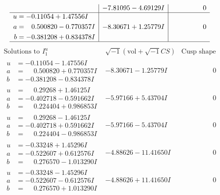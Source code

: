 \documentclass[1p]{elsarticle_modified}
\theoremstyle{definition}
\newcommand{\I}{\sqrt{-1}}
\begin{document}
$$\begin{array}{c|c|c}
 & -7.81095 - 4.69129 I & \phantom{-0.000000 } 0 \\ \hline\begin{aligned}
u &= -0.11054 + 1.47556 I \\
a &= \phantom{-}0.500820 - 0.770357 I \\
b &= -0.381208 + 0.834378 I\end{aligned}
 & -8.30671 + 1.25779 I & \phantom{-0.000000 } 0\\
 \hline 
 \end{array}$$\newpage$$\begin{array}{c|c|c}  
\text{Solutions to }I^u_{1}& \I (\text{vol} + \sqrt{-1}CS) & \text{Cusp shape}\\
 \hline 
\begin{aligned}
u &= -0.11054 - 1.47556 I \\
a &= \phantom{-}0.500820 + 0.770357 I \\
b &= -0.381208 - 0.834378 I\end{aligned}
 & -8.30671 - 1.25779 I & \phantom{-0.000000 } 0 \\ \hline\begin{aligned}
u &= \phantom{-}0.29268 + 1.46125 I \\
a &= -0.402718 - 0.591662 I \\
b &= \phantom{-}0.224404 + 0.986853 I\end{aligned}
 & -5.97166 + 5.43704 I & \phantom{-0.000000 } 0 \\ \hline\begin{aligned}
u &= \phantom{-}0.29268 - 1.46125 I \\
a &= -0.402718 + 0.591662 I \\
b &= \phantom{-}0.224404 - 0.986853 I\end{aligned}
 & -5.97166 - 5.43704 I & \phantom{-0.000000 } 0 \\ \hline\begin{aligned}
u &= -0.33248 + 1.45296 I \\
a &= -0.522607 + 0.612576 I \\
b &= \phantom{-}0.276570 - 1.013290 I\end{aligned}
 & -4.88626 - 11.41650 I & \phantom{-0.000000 } 0 \\ \hline\begin{aligned}
u &= -0.33248 - 1.45296 I \\
a &= -0.522607 - 0.612576 I \\
b &= \phantom{-}0.276570 + 1.013290 I\end{aligned}
 & -4.88626 + 11.41650 I & \phantom{-0.000000 } 0 \\ \hline\begin{aligned}

\end{aligned}
\end{array}$$
\end{document}
